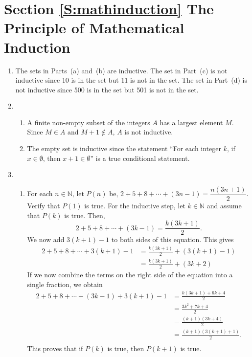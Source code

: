 \section*{Section \ref{S:mathinduction} The Principle of Mathematical Induction}

\begin{enumerate}
\item The sets in Parts~(a) and~(b) are inductive.  The set in Part~(c) is not inductive since 10 is in the set but 11 is not in the set.  The set in Part~(d) is not inductive since 500 is in the set but 501 is not in the set.



\item \begin{enumerate}
\item A finite non-empty subset of the integers $A$ has a largest element $M$.  Since $M \in A$ and $M+1 \notin A$, $A$ is not inductive.

\item The empty set is inductive since the statement ``For each integer $k$, if 
$x \in \emptyset$, then $x + 1 \in \emptyset$'' is a true conditional statement.  
\end{enumerate}



\item \begin{enumerate}
\item For each  $n \in \mathbb{N}$, let  $P\left( n \right)$ be, 
$2 + 5 + 8 +  \cdots  + \left( {3n - 1} \right) = \dfrac{{n\left( {3n + 1} \right)}}{2}$.  Verify that  
$P\left( 1 \right)$  is true.   For the inductive step, let $k \in \mathbb{N}$ and assume that 
$P \left( k \right)$ is true.  Then,
\[
  2 + 5 + 8 + \cdots  + \left( {3k - 1} \right) = \frac{{k \left( {3k + 1} \right)}}{2}. 
\]
We now add $3 \left( k + 1 \right) - 1$ to both sides of this equation.  This gives
\begin{align*}
  2 + 5 + 8 + \cdots  + 3 \left( {k + 1} \right)-1 &= 
           \frac{{k \left( {3k + 1} \right)}}{2} + \left( 3 \left( k + 1 \right) - 1 \right) \\   
   &= \frac{{k \left( {3k + 1} \right)}}{2} + \left( {3k + 2} \right)
\end{align*}
If we now combine the terms on the right side of the equation into a single fraction, we obtain
\begin{align*} 
 2 + 5 + 8 +  \cdots  + \left( {3k - 1} \right) + 3 \left( {k + 1} \right)-1  &= \frac{k \left( 3k + 1 \right) + 6k+4}{2} \\
   &= \frac{ 3k^2 + 7k + 4}{2} \\
   &= \frac{ \left( k + 1 \right) \left( 3k + 4 \right)}{2} \\
   &= \frac{ \left( k + 1 \right) \left( 3 \left( k + 1 \right) + 1 \right)}{2}. \\
\end{align*}
This proves that if  $P\left( k \right)$ is true, then $P\left( {k + 1} \right)$ is true.


\end{enumerate}
\end{enumerate}

